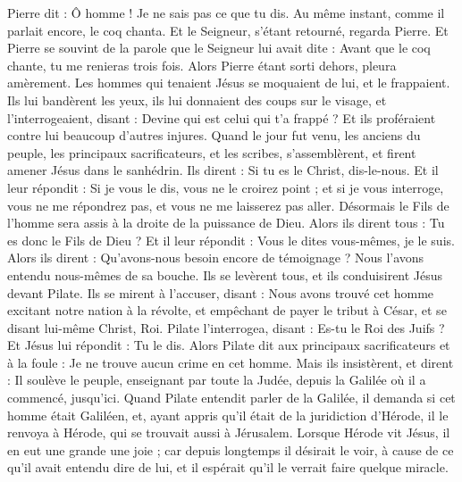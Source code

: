 \begin{multicols}{2}
Pierre dit : Ô homme ! Je ne sais pas ce que tu dis. Au même instant, comme il parlait encore, le coq chanta.
Et le Seigneur, s’étant retourné, regarda Pierre. Et Pierre se souvint de la parole que le Seigneur lui avait dite : Avant que le coq chante, tu me renieras trois fois.
Alors Pierre étant sorti dehors, pleura amèrement.
Les hommes qui tenaient Jésus se moquaient de lui, et le frappaient.
Ils lui bandèrent les yeux, ils lui donnaient des coups sur le visage, et l'interrogeaient, disant : Devine qui est celui qui t'a frappé ?
Et ils proféraient contre lui beaucoup d’autres injures.
Quand le jour fut venu, les anciens du peuple, les principaux sacrificateurs, et les scribes, s'assemblèrent, et firent amener Jésus dans le sanhédrin.
Ils dirent : Si tu es le Christ, dis-le-nous. Et il leur répondit : Si je vous le dis, vous ne le croirez point ;
et si je vous interroge, vous ne me répondrez pas, et vous ne me laisserez pas aller.
Désormais le Fils de l'homme sera assis à la droite de la puissance de Dieu.
Alors ils dirent tous : Tu es donc le Fils de Dieu ? Et il leur répondit : Vous le dites vous-mêmes, je le suis.
Alors ils dirent : Qu'avons-nous besoin encore de témoignage ? Nous l'avons entendu nous-mêmes de sa bouche.
\VerseOne{}Ils se levèrent tous, et ils conduisirent Jésus devant Pilate.
Ils se mirent à l'accuser, disant : Nous avons trouvé cet homme excitant notre nation à la révolte, et empêchant de payer le tribut à César, et se disant lui-même Christ, Roi.
Pilate l'interrogea, disant : Es-tu le Roi des Juifs ? Et Jésus lui répondit : Tu le dis.
Alors Pilate dit aux principaux sacrificateurs et à la foule : Je ne trouve aucun crime en cet homme.
Mais ils insistèrent, et dirent : Il soulève le peuple, enseignant par toute la Judée, depuis la Galilée où il a commencé, jusqu’ici.
Quand Pilate entendit parler de la Galilée, il demanda si cet homme était Galiléen,
et, ayant appris qu'il était de la juridiction d'Hérode, il le renvoya à Hérode, qui se trouvait aussi à Jérusalem.
Lorsque Hérode vit Jésus, il en eut une grande une joie ; car depuis longtemps il désirait le voir, à cause de ce qu’il avait entendu dire de lui, et il espérait qu'il le verrait faire quelque miracle.

\end{multicols}
